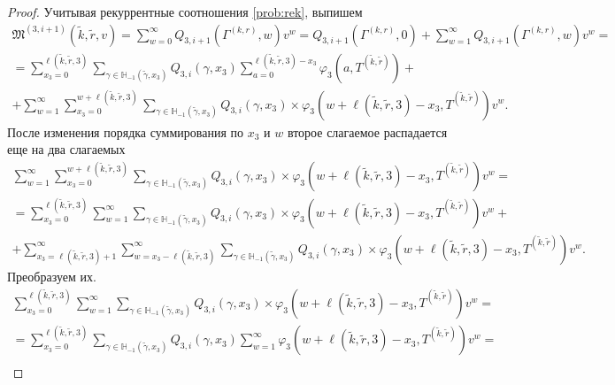 \documentclass[a4paper,12pt,russian]{extarticle}
\begin{document}
\begin{proof}
Учитывая рекуррентные соотношения \eqref{prob:rek}, выпишем
\begin{multline}
\mathfrak{M}^{(3,i+1)}(\tilde{k},\tilde{r},v) =\sum_{w=0}^{\infty} Q_{3,i+1}(\Gamma^{(k,r)},w) v^w = Q_{3,i+1}(\Gamma^{(k,r)},0) + \sum_{w=1}^{\infty} Q_{3,i+1}(\Gamma^{(k,r)},w) v^w =\\
=\sum_{x_3=0}^{\ell(\tilde{k},\tilde{r},3)}\sum_{\gamma \in {\mathbb H}_{-1}(\tilde{\gamma},x_3)} Q_{3,i}(\gamma,x_3) \sum_{a=0}^{\ell(\tilde{k},\tilde{r},3) - x_3} \varphi_3(a,T^{(\tilde{k},\tilde{r})}) + \\
+ \sum_{w=1}^{\infty} \sum_{x_3=0}^{w +  \ell(\tilde{k},\tilde{r},3)}\sum_{\gamma \in {\mathbb H}_{-1}(\tilde{\gamma},x_3)} Q_{3,i}(\gamma,x_3) \times 
\varphi_3(w + \ell(\tilde{k},\tilde{r},3) - x_3,T^{(\tilde{k},\tilde{r})}) v^w.
\label{sum:zero}
\end{multline}
После изменения порядка суммирования по $x_3$ и $w$ второе слагаемое распадается еще на два слагаемых
\begin{multline}
\sum_{w=1}^{\infty} \sum_{x_3=0}^{w +  \ell(\tilde{k},\tilde{r},3)}\sum_{\gamma \in {\mathbb H}_{-1}(\tilde{\gamma},x_3)} Q_{3,i}(\gamma,x_3) \times 
\varphi_3(w + \ell(\tilde{k},\tilde{r},3) - x_3,T^{(\tilde{k},\tilde{r})}) v^w = \\
= \sum_{x_3=0}^{\ell(\tilde{k},\tilde{r},3)}\sum_{w=1}^{\infty}\sum_{\gamma \in {\mathbb H}_{-1}(\tilde{\gamma},x_3)} Q_{3,i}(\gamma,x_3) \times 
\varphi_3(w + \ell(\tilde{k},\tilde{r},3) - x_3,T^{(\tilde{k},\tilde{r})}) v^w + \\
+\sum_{x_3=\ell(\tilde{k},\tilde{r},3) + 1}^{\infty}\sum_{w=x_3-\ell(\tilde{k},\tilde{r},3)}^{\infty}\sum_{\gamma \in {\mathbb H}_{-1}(\tilde{\gamma},x_3)} Q_{3,i}(\gamma,x_3) \times 
\varphi_3(w + \ell(\tilde{k},\tilde{r},3) - x_3,T^{(\tilde{k},\tilde{r})}) v^w.
\label{double:sum}
\end{multline}
Преобразуем их.
\begin{multline}
 \sum_{x_3=0}^{\ell(\tilde{k},\tilde{r},3)}\sum_{w=1}^{\infty}  \sum_{\gamma \in {\mathbb H}_{-1}(\tilde{\gamma},x_3)} Q_{3,i}(\gamma,x_3) \times 
\varphi_3(w + \ell(\tilde{k},\tilde{r},3) - x_3,T^{(\tilde{k},\tilde{r})}) v^w = \\
=  \sum_{x_3=0}^{\ell(\tilde{k},\tilde{r},3)}  \sum_{\gamma \in {\mathbb H}_{-1}(\tilde{\gamma},x_3)} Q_{3,i}(\gamma,x_3)  \sum_{w=1}^{\infty} 
\varphi_3(w + \ell(\tilde{k},\tilde{r},3) - x_3,T^{(\tilde{k},\tilde{r})}) v^w = \\

\end{multline}
\end{proof}
\end{document}
